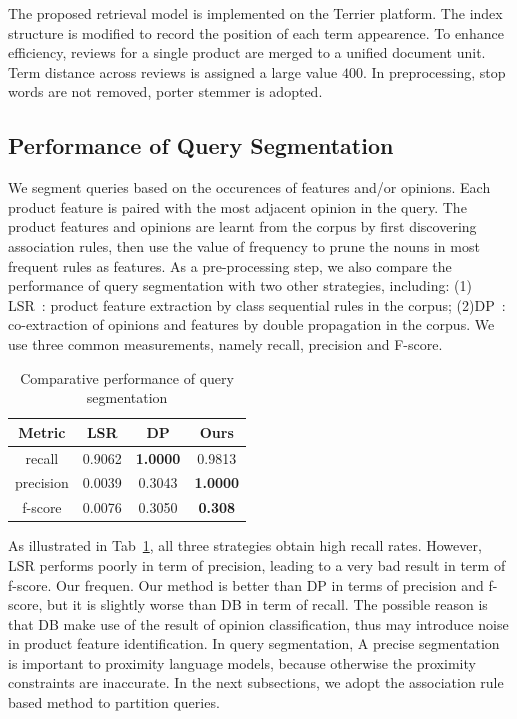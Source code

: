 \documentclass[preprint]{elsarticle}
\begin{document}
The proposed retrieval model is implemented on the Terrier\cite{Ounis2006Terrier} platform. The index structure is modified to record the position of each term appearence. To enhance efficiency, reviews for a single product are merged to a unified document unit. Term distance across reviews is assigned a large value $400$. In preprocessing, stop words are not removed, porter stemmer is adopted.

\subsection{Performance of Query Segmentation}\label{sec:exp-query}
We segment queries based on the occurences of features and/or opinions. Each product feature is paired with the most adjacent opinion in the query. The product features and opinions are learnt from the corpus by first discovering association rules, then use the value of frequency to prune the nouns in most frequent rules as features. As a pre-processing step, we also compare the performance of query segmentation with two other strategies, including: (1) LSR~\cite{Hu2006Opinion}: product feature extraction by class sequential rules in the corpus; (2)DP~\cite{Qiu2011Opinion}: co-extraction of opinions and features by double propagation in the corpus. We use three common measurements, namely recall, precision and F-score.

\begin{table}
\center
\begin{tabular}{|c|c|c|c|}
\hline
Metric & LSR &	DP &	Ours \\\hline
recall &	0.9062 	& \textbf{1.0000} & 0.9813\\\hline
precision	& 0.0039 &	0.3043 & \textbf{1.0000} \\\hline
f-score	& 0.0076	& 0.3050 & \textbf{0.308}  \\\hline
\end{tabular}
\caption{Comparative performance of query segmentation}\label{tab:queryseg}
\end{table}
As illustrated in Tab~\ref{tab:queryseg}, all three strategies obtain high recall rates. However, LSR performs poorly in term of precision, leading to a very bad result in term of f-score. Our frequen. Our method is better than DP in terms of precision and f-score, but it is slightly worse than DB in term of recall. The possible reason is that DB make use of the result of opinion classification, thus may introduce noise in product feature identification. In query segmentation, A precise segmentation is important to proximity language models, because otherwise the proximity constraints are inaccurate. In the next subsections, we adopt the association rule based method to partition queries.
\end{document}
